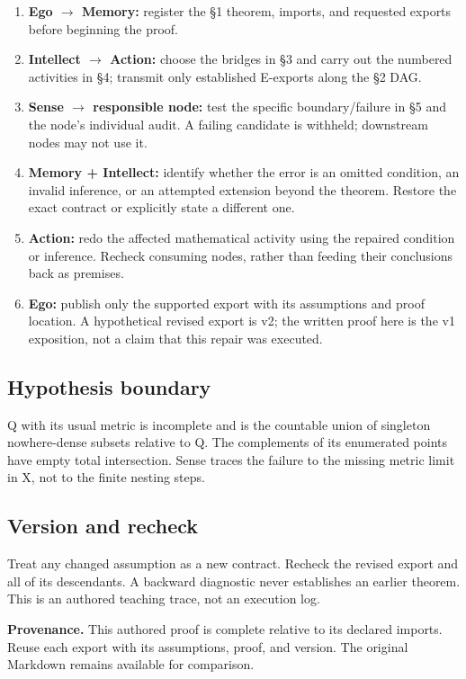 \documentclass[preprint,12pt,aps,pra,showkeys,amsmath,amssymb,superscriptaddress,floatfix]{revtex4-2}
\theoremstyle{definition}
\theoremstyle{remark}
\providecommand{\tightlist}{\setlength{\itemsep}{2pt}\setlength{\parskip}{0pt}}
\begin{document}
\begin{enumerate}
\def\labelenumi{\arabic{enumi}.}
\tightlist
\item
  \textbf{Ego \(\to\) Memory:} register the §1 theorem, imports, and
  requested exports before beginning the proof.
\item
  \textbf{Intellect \(\to\) Action:} choose the bridges in §3 and carry
  out the numbered activities in §4; transmit only established E-exports
  along the §2 DAG.
\item
  \textbf{Sense \(\to\) responsible node:} test the specific
  boundary/failure in §5 and the node's individual audit. A failing
  candidate is withheld; downstream nodes may not use it.
\item
  \textbf{Memory + Intellect:} identify whether the error is an omitted
  condition, an invalid inference, or an attempted extension beyond the
  theorem. Restore the exact contract or explicitly state a different
  one.
\item
  \textbf{Action:} redo the affected mathematical activity using the
  repaired condition or inference. Recheck consuming nodes, rather than
  feeding their conclusions back as premises.
\item
  \textbf{Ego:} publish only the supported export with its assumptions
  and proof location. A hypothetical revised export is v2; the written
  proof here is the v1 exposition, not a claim that this repair was
  executed.
\end{enumerate}

\subsection{Hypothesis boundary}
Q with its usual metric is incomplete and is the countable union of
singleton nowhere-dense subsets relative to Q. The complements of its
enumerated points have empty total intersection. Sense traces the
failure to the missing metric limit in X, not to the finite nesting
steps.

\subsection{Version and recheck}
Treat any changed assumption as a new contract. Recheck the revised
export and all of its descendants. A backward diagnostic never
establishes an earlier theorem. This is an authored teaching trace, not
an execution log.

\par\medskip\begingroup\small\linespread{1.0}\selectfont\noindent\textbf{Provenance.} This authored proof is complete relative to its declared imports. Reuse
each export with its assumptions, proof, and version. The original
Markdown remains available for comparison.
\par\endgroup
\end{document}
